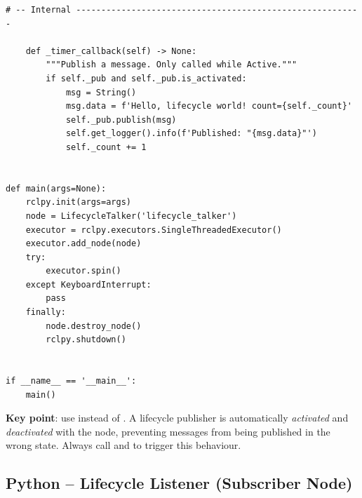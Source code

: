 \documentclass[11pt,a4paper]{csarticle}
\begin{document}
\begin{lstlisting}[style=python,caption={lifecycle\_talker.py -- full example}]
    # -- Internal ---------------------------------------------------------

    def _timer_callback(self) -> None:
        """Publish a message. Only called while Active."""
        if self._pub and self._pub.is_activated:
            msg = String()
            msg.data = f'Hello, lifecycle world! count={self._count}'
            self._pub.publish(msg)
            self.get_logger().info(f'Published: "{msg.data}"')
            self._count += 1


def main(args=None):
    rclpy.init(args=args)
    node = LifecycleTalker('lifecycle_talker')
    executor = rclpy.executors.SingleThreadedExecutor()
    executor.add_node(node)
    try:
        executor.spin()
    except KeyboardInterrupt:
        pass
    finally:
        node.destroy_node()
        rclpy.shutdown()


if __name__ == '__main__':
    main()
\end{lstlisting}

\begin{notebox}
  \textbf{Key point}: use  instead of
  .  A lifecycle publisher is automatically
  \emph{activated} and \emph{deactivated} with the node, preventing messages
  from being published in the wrong state.  Always call
   and 
  to trigger this behaviour.
\end{notebox}

\subsection{Python -- Lifecycle Listener (Subscriber Node)}
\end{document}
